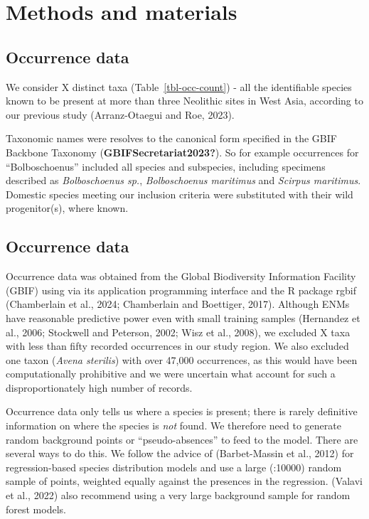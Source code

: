 \documentclass[
  number,
  review]{elsarticle}
\begin{document}
\section{Methods and materials}\label{methods-and-materials}

\subsection{Occurrence data}\label{occurrence-data}

We consider X distinct taxa (Table~\ref{tbl-occ-count}) - all the
identifiable species known to be present at more than three Neolithic
sites in West Asia, according to our previous study (Arranz-Otaegui and
Roe, 2023).

Taxonomic names were resolves to the canonical form specified in the
GBIF Backbone Taxonomy (\textbf{GBIFSecretariat2023?}). So for example
occurrences for ``Bolboschoenus'' included all species and subspecies,
including specimens described as \emph{Bolboschoenus sp.},
\emph{Bolboschoenus maritimus} and \emph{Scirpus maritimus}. Domestic
species meeting our inclusion criteria were substituted with their wild
progenitor(s), where known.

\subsection{Occurrence data}\label{occurrence-data-1}

Occurrence data was obtained from the Global Biodiversity Information
Facility (GBIF) using via its application programming interface and the
R package rgbif (Chamberlain et al., 2024; Chamberlain and Boettiger,
2017). Although ENMs have reasonable predictive power even with small
training samples (Hernandez et al., 2006; Stockwell and Peterson, 2002;
Wisz et al., 2008), we excluded X taxa with less than fifty recorded
occurrences in our study region. We also excluded one taxon (\emph{Avena
sterilis}) with over 47,000 occurrences, as this would have been
computationally prohibitive and we were uncertain what account for such
a disproportionately high number of records.

Occurrence data only tells us where a species is present; there is
rarely definitive information on where the species is \emph{not} found.
We therefore need to generate random background points or
``pseudo-absences'' to feed to the model. There are several ways to do
this. We follow the advice of (Barbet-Massin et al., 2012) for
regression-based species distribution models and use a large (:10000)
random sample of points, weighted equally against the presences in the
regression. (Valavi et al., 2022) also recommend using a very large
background sample for random forest models.
\end{document}
